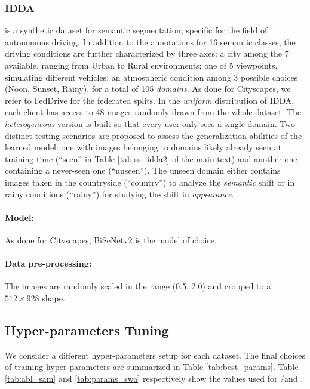 \subsubsection{IDDA} \cite{alberti2020idda} is a synthetic dataset for semantic segmentation, specific for the field of autonomous driving. In addition to the annotations for 16 semantic classes, the driving conditions are further characterized by three axes: a city among the 7 available, ranging from Urban to Rural environments; one of 5 viewpoints, simulating different vehicles; an atmospheric condition among 3 possible choices (Noon, Sunset, Rainy), for a total of 105\textit{ domains}. As done for Cityscapes, we refer to FedDrive \cite{fantauzzo2022feddrive} for the federated splits. In the \textit{uniform} distribution of IDDA, each client has access to 48 images randomly drawn from the whole dataset. The \textit{heterogeneous} version is built so that every user only sees a single domain. Two distinct testing scenarios are proposed to assess the generalization abilities of the learned model: one with images belonging to domains likely already seen at training time (``seen'' in Table \ref{tab:ss_idda2} of the main text) and another one containing a never-seen one (``unseen''). The unseen domain either contains images taken in the countryside (``country'') to analyze the \textit{semantic} shift or in rainy conditions (``rainy'') for studying the shift in \textit{appearance}.

\paragraph{Model:} As done for Cityscapes, BiSeNetv2 is the model of choice.

\paragraph{Data pre-processing:} The images are randomly scaled in the range (0.5, 2.0) and cropped to a $512\times928$ shape. 

\subsection{Hyper-parameters Tuning}
We consider a different hyper-parameters setup for each dataset. The final choices of training hyper-parameters are summarized in Table \ref{tab:best_params}. Table \ref{tab:abl_sam} and \ref{tab:params_swa} respectively show the values used for \sam/\asam and \swa.

